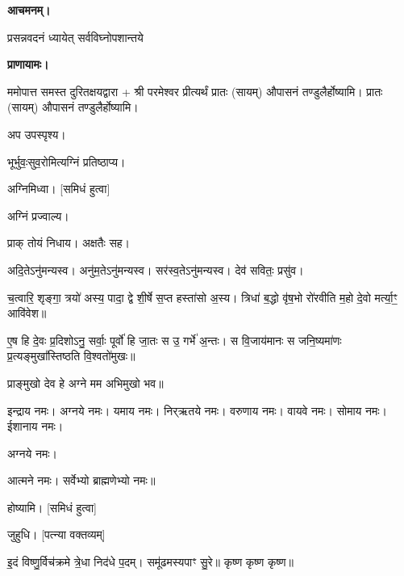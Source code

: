 
\textbf{आचमनम्।}

{प्रसन्नवदनं ध्यायेत् सर्वविघ्नोपशान्तये}
 
\textbf{प्राणायामः।} 

ममोपात्त समस्त दुरितक्षयद्वारा + श्री परमेश्वर प्रीत्यर्थं प्रातः (सायम्) औपासनं तण्डुलैर्होष्यामि। प्रातः (सायम्) औपासनं तण्डुलैर्होष्यामि।

अप उपस्पृश्य।


भूर्भुवः॒सुव॒रोमित्यग्निं प्रतिष्ठाप्य।

अग्निमिध्वा। [समिधं हुत्वा]

अग्निं प्रज्वाल्य।

प्राक् तोयं निधाय। अक्षतैः सह।

अदि॒तेऽनु॑मन्यस्व। अनु॑म॒तेऽनु॑मन्यस्व। सर॑स्व॒तेऽनु॑मन्यस्व। देव॑ सवितः॒ प्रसु॑व।


च॒त्वारि॒ शृङ्गा॒ त्रयो॑ अस्य॒ पादा॒ द्वे शी॒र्\mbox{}षे स॒प्त हस्ता॑सो अ॒स्य। त्रिधा॑ ब॒द्धो वृ॑ष॒भो रो॑रवीति म॒हो दे॒वो मर्त्या॒ꣳ॒ आवि॑वेश॥

ए॒ष हि दे॒वः प्र॒दिशोऽनु॒ सर्वाः॒ पूर्वो॑ हि जा॒तः स उ॒ गर्भे॑ अ॒न्तः। स वि॒जाय॑मानः स जनि॒ष्यमा॑णः प्र॒त्यङ्मुखा᳚स्तिष्ठति वि॒श्वतो॑मुखः॥ 

प्राङ्मुखो देव हे अग्ने मम अभिमुखो भव॥

इन्द्राय नमः। अग्नये नमः। यमाय नमः। निर्‌ऋतये नमः। 
वरुणाय नमः। वायवे नमः। सोमाय नमः। ईशानाय नमः। 

अग्नये नमः। 






आत्मने नमः। सर्वेभ्यो ब्राह्मणेभ्यो नमः॥



होष्यामि। [समिधं हुत्वा]

जुहुधि। [पत्न्या वक्तव्यम्]

इ॒दं विष्णु॒र्विच॑क्रमे त्रे॒धा निद॑धे प॒दम्। समू॑ढमस्यपाꣳ सु॒रे॥ कृष्ण कृष्ण कृष्ण॥

